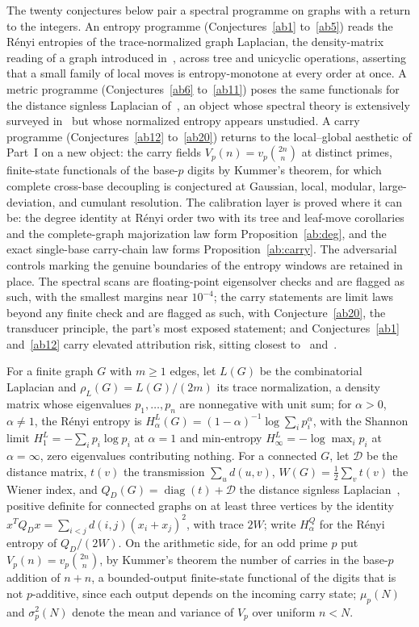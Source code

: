 \documentclass[11pt]{article}
\theoremstyle{definition}
\begin{document}
The twenty conjectures below pair a spectral programme on graphs with a return to the integers.  An entropy programme (Conjectures~\ref{ab1} to~\ref{ab5}) reads the R\'enyi entropies of the trace-normalized graph Laplacian, the density-matrix reading of a graph introduced in~\cite{BGS06}, across tree and unicyclic operations, asserting that a small family of local moves is entropy-monotone at every order at once.  A metric programme (Conjectures~\ref{ab6} to~\ref{ab11}) poses the same functionals for the distance signless Laplacian of~\cite{AH13}, an object whose spectral theory is extensively surveyed in~\cite{RGW26} but whose normalized entropy appears unstudied.  A carry programme (Conjectures~\ref{ab12} to~\ref{ab20}) returns to the local--global aesthetic of Part~I on a new object: the carry fields $V_p(n)=v_p\binom{2n}{n}$ at distinct primes, finite-state functionals of the base-$p$ digits by Kummer's theorem, for which complete cross-base decoupling is conjectured at Gaussian, local, modular, large-deviation, and cumulant resolution.  The calibration layer is proved where it can be: the degree identity at R\'enyi order two with its tree and leaf-move corollaries and the complete-graph majorization law form Proposition~\ref{ab:deg}, and the exact single-base carry-chain law forms Proposition~\ref{ab:carry}.  The adversarial controls marking the genuine boundaries of the entropy windows are retained in place.  The spectral scans are floating-point eigensolver checks and are flagged as such, with the smallest margins near $10^{-4}$; the carry statements are limit laws beyond any finite check and are flagged as such, with Conjecture~\ref{ab20}, the transducer principle, the part's most exposed statement; and Conjectures~\ref{ab1} and~\ref{ab12} carry elevated attribution risk, sitting closest to~\cite{DHL17} and~\cite{Drm01}.

For a finite graph $G$ with $m\ge1$ edges, let $L(G)$ be the combinatorial Laplacian and $\rho_L(G)=L(G)/(2m)$ its trace normalization, a density matrix whose eigenvalues $p_1,\ldots,p_n$ are nonnegative with unit sum; for $\alpha>0$, $\alpha\ne1$, the R\'enyi entropy is $H^L_\alpha(G)=(1-\alpha)^{-1}\log\sum_ip_i^\alpha$, with the Shannon limit $H^L_1=-\sum_ip_i\log p_i$ at $\alpha=1$ and min-entropy $H^L_\infty=-\log\max_ip_i$ at $\alpha=\infty$, zero eigenvalues contributing nothing.  For a connected $G$, let $\mathcal D$ be the distance matrix, $t(v)$ the transmission $\sum_ud(u,v)$, $W(G)=\tfrac12\sum_vt(v)$ the Wiener index, and $Q_D(G)=\operatorname{diag}(t)+\mathcal D$ the distance signless Laplacian~\cite{AH13}, positive definite for connected graphs on at least three vertices by the identity $x^{T}Q_Dx=\sum_{i<j}d(i,j)(x_i+x_j)^2$, with trace $2W$; write $H^Q_\alpha$ for the R\'enyi entropy of $Q_D/(2W)$.  On the arithmetic side, for an odd prime $p$ put $V_p(n)=v_p\binom{2n}{n}$, by Kummer's theorem the number of carries in the base-$p$ addition of $n+n$, a bounded-output finite-state functional of the digits that is not $p$-additive, since each output depends on the incoming carry state; $\mu_p(N)$ and $\sigma^2_p(N)$ denote the mean and variance of $V_p$ over uniform $n<N$.
\end{document}
